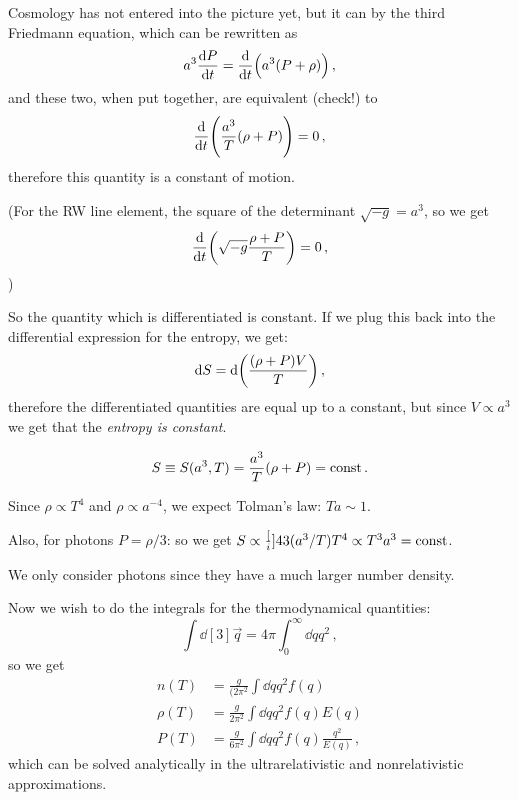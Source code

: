 \documentclass[main.tex]{subfiles}
\begin{document}
Cosmology has not entered into the picture yet, but it can by the third Friedmann equation, which can be rewritten as 
%
\begin{equation}
  a^3 \dv{P}{t} =\dv{}{t} \qty(a^3 (P + \rho ))
\,,
\end{equation}
%
and these two, when put together, are equivalent (check!) to 
%
\begin{equation}
  \dv{}{t} \qty(\frac{a^3}{T} (\rho + P ))=0
\,,
\end{equation}
%
therefore this quantity is a constant of motion. 


(For the RW line element, the square of the determinant \(\sqrt{-g} =  a^3 \), so we get 
%
\begin{equation}
  \dv{}{t} \qty(\sqrt{-g }  \frac{\rho + P}{T}) = 0
\,,
\end{equation}
)

So the quantity which is differentiated is constant. If we plug this back into the differential expression for the entropy, we get: 
%
\begin{equation}
  \dd{S} = \dd \qty(\frac{(\rho + P) V}{T})
\,,
\end{equation}
%
therefore the differentiated quantities are equal up to a constant, but since \(V \propto a^3\) we get that the \emph{entropy is constant}.

\begin{equation}
  S \equiv S(a^3, T) 
  = \frac{a^3}{T} \qty(\rho + P)
  = \text{const}
\,.
\end{equation}

Since \(\rho \propto T^{4}\) and \(\rho \propto a^{-4}\), we expect Tolman's law: \(Ta \sim 1\).

Also, for photons \(P  = \rho / 3\): so we get \(S \propto \frac[i]{4}{3} (a^3/T) T^{4} \propto T^3 a^3 = \text{const}\).

We only consider photons since they have a much larger number density.


Now we wish to do the integrals for the thermodynamical quantities: 
%
\begin{equation}
  \int  \dd[3]{\vec{q}} = 4 \pi \int_0^{\infty}  \dd{q} q^2 
\,,
\end{equation}
%
so we get 
%
\begin{subequations}
\begin{align}
  n(T) &= \frac{g}{(2\pi^2} \int  \dd{q} q^2 f(q) \\ 
  \rho (T) &= \frac{g}{2\pi^2} \int  \dd{q} q^2 f(q) E(q) \\ 
  P (T) &= \frac{g}{6\pi^2} \int  \dd{q} q^2 f(q) \frac{q^2}{E(q)} 
\,,
\end{align}
\end{subequations}
%
which can be solved analytically in the ultrarelativistic and nonrelativistic approximations.
\end{document}
